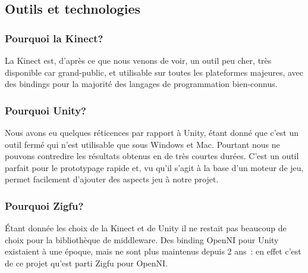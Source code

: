 \subsection{Outils et technologies} 
\subsubsection{Pourquoi la Kinect?}
La Kinect est, d'après ce que nous venons de voir, un outil peu cher, 
très disponible car grand-public, et utilisable sur toutes les plateformes
majeures, avec des bindings pour la majorité des langages de programmation 
bien-connus.

\subsubsection{Pourquoi Unity?}
Nous avons eu quelques réticences par rapport à Unity, étant donné que c'est 
un outil fermé qui n'est utilisable que sous Windows et Mac. Pourtant nous ne 
pouvons contredire les résultats obtenus en de très courtes durées. C'est
un outil parfait pour le prototypage rapide et, vu qu'il s'agit à la base d'un
moteur de jeu, permet facilement d'ajouter des aspects jeu à notre projet.

\subsubsection{Pourquoi Zigfu?}
Étant donnée les choix de la Kinect et de Unity il ne restait pas beaucoup de
choix pour la bibliothèque de middleware. Des binding OpenNI pour Unity existaient
à une époque, mais ne sont plus maintenus depuis 2 ans~: en effet c'est de ce
projet qu'est parti Zigfu pour OpenNI\cite{zigfu_branch}.
